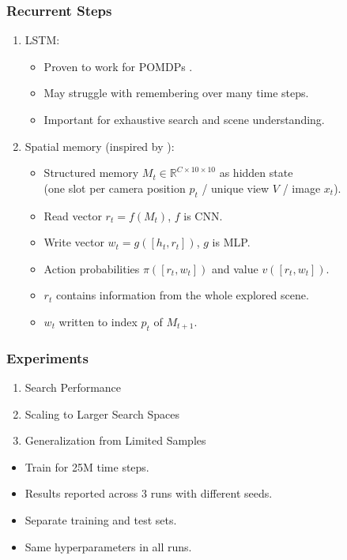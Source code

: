 \begin{frame}
    \frametitle{Recurrent Steps}

    \begin{enumerate}
        \item LSTM:
        \begin{itemize}
            \item Proven to work for POMDPs \cite{hausknecht_deep_2017,mnih_asynchronous_2016,mirowski_learning_2017,gupta_cognitive_2019}.
            \item May struggle with remembering over many time steps.
            \item Important for exhaustive search and scene understanding.
        \end{itemize}
        \item Spatial memory (inspired by \cite{parisotto_neural_2017}):
        \begin{itemize}
            \item Structured memory \(M_t \in \mathbb{R}^{C \times 10 \times 10}\) as hidden state \\
            (one slot per camera position \(p_t\) / unique view \(V\) / image \(x_t\)).
            \item Read vector \(r_t = f(M_t)\), \(f\) is CNN.
            \item Write vector \(w_t = g(\left\lbrack h_t, r_t \right\rbrack)\), \(g\) is MLP.
            \item Action probabilities \(\pi(\left\lbrack r_t, w_t \right\rbrack)\) and value \(v(\left\lbrack r_t, w_t \right\rbrack)\).
            \item \(r_t\) contains information from the whole explored scene.
            \item \(w_t\) written to index \(p_t\) of \(M_{t+1}\).
        \end{itemize}
    \end{enumerate}
\end{frame}

\begin{frame}
    \frametitle{Experiments}

    \begin{enumerate}
        \item Search Performance
        \item Scaling to Larger Search Spaces
        \item Generalization from Limited Samples
    \end{enumerate}

    \begin{itemize}
        \item Train for 25M time steps.
        \item Results reported across 3 runs with different seeds.
        \item Separate training and test sets.
        \item Same hyperparameters in all runs.
    \end{itemize}
\end{frame}



